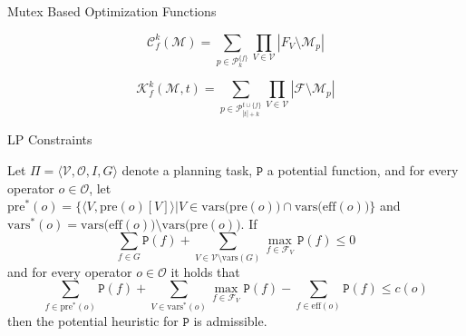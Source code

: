 \documentclass[aspectratio=169, xcolor=dvipsnames]{beamer}
\begin{document}
    \begin{frame}[c]{Mutex Based Optimization Functions}
        \begin{definition}
            \[\mathcal{C}_f^k(\mathcal{M}) = \sum_{p\in\mathcal{P}_k^{\{f\}}}\prod_{V\in\mathcal{V}} |F_V\setminus\mathcal{M}_p|\]
        \end{definition}

        \begin{definition}
            \[\mathcal{K}^k_f(\mathcal{M}, t) = \sum_{p\in\mathcal{P}^{t\cup\{f\}}_{|t|+k}}\prod_{V\in\mathcal{V}}|\mathcal{F}\setminus\mathcal{M}_p|\]
        \end{definition}
    \end{frame}

    \begin{frame}[c]{LP Constraints}
        \begin{theorem}
            \label{theorem:theorem 5} %
            Let $\Pi = \langle \mathcal{V}, \mathcal{O}, I, G \rangle$ denote a planning task, $\mathtt{P}$ a
            potential function, and for every operator $o\in\mathcal{O}$, let
            $\mathrm{pre}^*(o)=\{\langle V, \mathrm{pre}(o)[V]\rangle |V\in \mathrm{vars(pre}(o))\cap\mathrm{vars(eff}(o))\}$ and
            $\mathrm{vars}^*(o)=\mathrm{vars(eff}(o))\setminus\mathrm{vars(pre}(o))$. If
            \begin{equation}
                \sum_{f\in G}\mathtt{P}(f)+\sum_{V\in\mathcal{V}\setminus\mathrm{vars}(G)}\max_{f\in\mathcal{F}_V}\mathtt{P}(f)\leq0\label{eq:1}
            \end{equation}
            and for every operator $o\in\mathcal{O}$ it holds that
            \begin{equation}
                \sum_{f\in\mathrm{pre}^*(o)}\mathtt{P}(f)+\sum_{V\in\mathrm{vars}^*(o)}\max_{f\in\mathcal{F}_V}\mathtt{P}(f)-\sum_{f\in\mathrm{eff}(o)}\mathtt{P}(f)\leq c(o)\label{eq:2}
            \end{equation}
            then the potential heuristic for $\mathtt{P}$ is admissible.
        \end{theorem}


    \end{frame}

    \backupend
\end{document}
